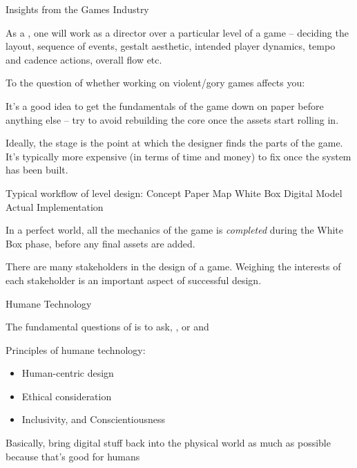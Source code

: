 \documentclass[11pt]{article}
\begin{document}
\begin{topic}{Insights from the Games Industry}
	\item As a , one will work as a director over a particular level of a game -- deciding the layout, sequence of events, gestalt aesthetic, intended player dynamics, tempo and cadence actions, overall flow etc.
	\item To the question of whether working on violent/gory games affects you: 
	\item It's a good idea to get the fundamentals of the game down on paper before anything else -- try to avoid rebuilding the core once the  assets start rolling in.
	\item Ideally, the  stage is the point at which the designer finds the  parts of the game. It's typically more expensive (in terms of time and money) to fix once the system has been built.
	\item Typical workflow of level design: Concept \textrightarrow Paper Map \textrightarrow White Box Digital Model \textrightarrow Actual Implementation
	\item In a perfect world, all the mechanics of the game is \textit{completed} during the White Box phase, before any final assets are added.
	\item There are many stakeholders in the design of a game. Weighing the interests of each stakeholder is an important aspect of successful design.
\end{topic}

\begin{topic}{Humane Technology}
	\item The fundamental questions of  is to ask, , or  and 
	\item Principles of humane technology:
	\begin{itemize}
		\item Human-centric design
		\item Ethical consideration
		\item Inclusivity, and Conscientiousness
	\end{itemize}
	\item Basically, bring digital stuff back into the physical world as much as possible because that's good for humans
\end{topic}
\end{document}

